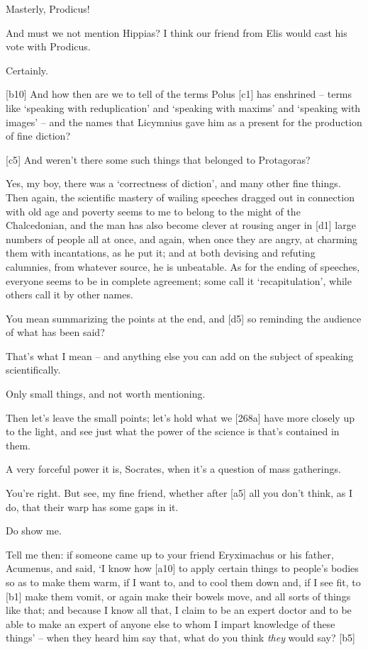  Masterly, Prodicus!

 And must we not mention Hippias? I think our friend from Elis
would cast his vote with Prodicus.

 Certainly.

{[}b10{]}  And how then are we to tell of the terms Polus
{[}c1{]} has enshrined -- terms like ‘speaking with reduplication' and
‘speaking with maxims' and ‘speaking with images' -- and the names that
Licymnius gave him as a present for the production of fine diction?

{[}c5{]}  And weren't there some such things that belonged to
Protagoras?

 Yes, my boy, there was a ‘correctness of diction', and many
other fine things. Then again, the scientific mastery of wailing
speeches dragged out in connection with old age and poverty seems to me
to belong to the might of the
Chalcedonian, and the
man has also become clever at rousing anger in {[}d1{]} large numbers of
people all at once, and again, when once they are angry, at charming
them with incantations, as he put it; and at both devising and refuting
calumnies, from whatever source, he is unbeatable. As for the ending of
speeches, everyone seems to be in complete agreement; some call it
‘recapitulation', while others call it by other names.

 You mean summarizing the points at the end, and {[}d5{]} so
reminding the audience of what has been said?

 That's what I mean -- and anything else you can add on the
subject of speaking scientifically.

 Only small things, and not worth mentioning.

 Then let's leave the small points; let's hold what we
{[}268a{]} have more closely up to the light, and see just what the
power of the science is that's contained in them.

 A very forceful power it is, Socrates, when it's a question of
mass gatherings.

 You're right. But see, my fine friend, whether after {[}a5{]}
all you don't think, as I do, that their warp has some gaps in it.

 Do show me.

 Tell me then: if someone came up to your friend Eryximachus or
his father, Acumenus,
and said, ‘I know how {[}a10{]} to apply certain things to people's
bodies so as to make them warm, if I want to, and to cool them down and,
if I see fit, to {[}b1{]} make them vomit, or again make their bowels
move, and all sorts of things like that; and because I know all that, I
claim to be an expert doctor and to be able to make an expert of anyone
else to whom I impart knowledge of these things' -- when they heard him
say that, what do you think {\em they} would say? {[}b5{]}

